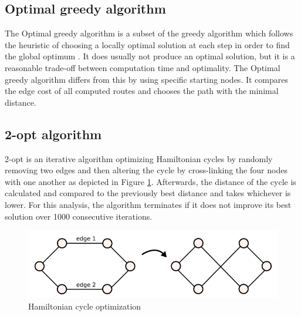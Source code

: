 \documentclass[conference]{IEEEtran}
\begin{document}
	\subsection{Optimal greedy algorithm}
	The Optimal greedy algorithm is a subset of the greedy algorithm which follows the heuristic of choosing a locally optimal solution at each step in order to find the global optimum \cite{greedy2005}. It does usually not produce an optimal solution, but it is a reasonable trade-off between computation time and optimality. The Optimal greedy algorithm differs from this by using specific starting nodes. It compares the edge cost of all computed routes and chooses the path with the minimal distance.
	\subsection{2-opt algorithm}
	2-opt is an iterative algorithm \cite{2opt1958} optimizing Hamiltonian cycles by randomly removing two edges and then altering the cycle by cross-linking the four nodes with one another as depicted in Figure \ref{fig:2opt}. Afterwards, the distance of the cycle is calculated and compared to the previously best distance and takes whichever is lower. For this analysis, the algorithm terminates if it does not improve its best solution over 1000 consecutive iterations.
	
	\begin{figure}[h]
    		\centering
    		\includegraphics[width=\textwidth/2]{twoopt.PNG}
    		\caption{Hamiltonian cycle optimization \cite{tspalgo2016}}
    		\label{fig:2opt}
	\end{figure}
	
\end{document}
